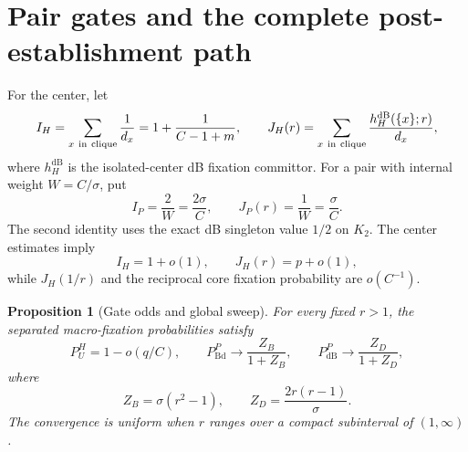 \documentclass[11pt]{article}
\newtheorem{proposition}[theorem]{Proposition}
\theoremstyle{definition}
\theoremstyle{remark}
\newcommand{\Bd}{\mathrm{Bd}}
\newcommand{\dB}{\mathrm{dB}}
\begin{document}
\section{Pair gates and the complete post-establishment path}

For the center, let
\[
 I_H=\sum_{x\ {\rm in\ clique}}\frac1{d_x}
 =1+\frac1{C-1+m},
\qquad
 J_H(r)=\sum_{x\ {\rm in\ clique}}
 \frac{h_H^{\dB}(\{x\};r)}{d_x},
\]
where $h_H^{\dB}$ is the isolated-center dB fixation committor.
For a pair with internal weight $W=C/\sigma$, put
\[
 I_P=\frac2W=\frac{2\sigma}{C},\qquad
 J_P(r)=\frac1W=\frac{\sigma}{C}.
\]
The second identity uses the exact dB singleton value $1/2$ on $K_2$.
The center estimates imply
\[
 I_H=1+o(1),\qquad J_H(r)=p+o(1),
\]
while $J_H(1/r)$ and the reciprocal core fixation probability are
$o(C^{-1})$.

\begin{proposition}[Gate odds and global sweep]
\label{prop:gate}
For every fixed $r>1$, the separated macro-fixation probabilities satisfy
\[
 P_U^H=1-o(q/C),
 \qquad
 P_{\Bd}^P\longrightarrow\frac{Z_B}{1+Z_B},
 \qquad
 P_{\dB}^P\longrightarrow\frac{Z_D}{1+Z_D},
\]
where
\[
 Z_B=\sigma(r^2-1),\qquad
 Z_D=\frac{2r(r-1)}{\sigma}.
\]
The convergence is uniform when $r$ ranges over a compact subinterval of
$(1,\infty)$.
\end{proposition}
\end{document}
